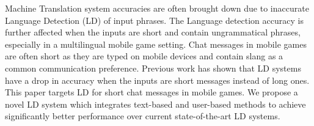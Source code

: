 Machine Translation system accuracies are often brought down due to inaccurate Language Detection (LD) of input phrases. The Language detection accuracy is further affected when the inputs are short and contain ungrammatical phrases, especially in a multilingual mobile game setting. Chat messages in mobile games are often short as they are typed on mobile devices and contain slang as a common communication preference. Previous work has shown that LD systems have a drop in accuracy when the inputs are short messages instead of long ones. This paper targets LD for short chat messages in mobile games. We propose a novel LD system which integrates text-based and user-based methods to achieve significantly better performance over current state-of-the-art LD systems.
